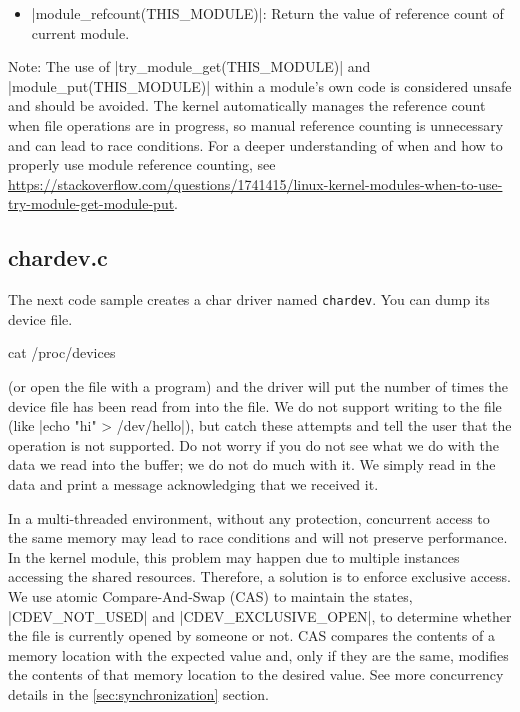 \documentclass[10pt, oneside]{book}
\begin{document}
\begin{itemize}
  \item \cpp|module_refcount(THIS_MODULE)|: Return the value of reference count of current module.
\end{itemize}

Note: The use of \cpp|try_module_get(THIS_MODULE)| and \cpp|module_put(THIS_MODULE)| within a module's own code is considered unsafe and should be avoided.
The kernel automatically manages the reference count when file operations are in progress,
so manual reference counting is unnecessary and can lead to race conditions.
For a deeper understanding of when and how to properly use module reference counting,
see \url{https://stackoverflow.com/questions/1741415/linux-kernel-modules-when-to-use-try-module-get-module-put}.

\subsection{chardev.c}
\label{sec:chardev_c}
The next code sample creates a char driver named \verb|chardev|.
You can dump its device file.

\begin{codebash}
cat /proc/devices
\end{codebash}

(or open the file with a program) and the driver will put the number of times the device file has been read from into the file.
We do not support writing to the file (like \sh|echo "hi" > /dev/hello|), but catch these attempts and tell the user that the operation is not supported.
Do not worry if you do not see what we do with the data we read into the buffer; we do not do much with it.
We simply read in the data and print a message acknowledging that we received it.

In a multi-threaded environment, without any protection, concurrent access to the same memory may lead to race conditions and will not preserve performance.
In the kernel module, this problem may happen due to multiple instances accessing the shared resources.
Therefore, a solution is to enforce exclusive access.
We use atomic Compare-And-Swap (CAS) to maintain the states, \cpp|CDEV_NOT_USED| and \cpp|CDEV_EXCLUSIVE_OPEN|, to determine whether the file is currently opened by someone or not.
CAS compares the contents of a memory location with the expected value and, only if they are the same, modifies the contents of that memory location to the desired value.
See more concurrency details in the \ref{sec:synchronization} section.
\end{document}
